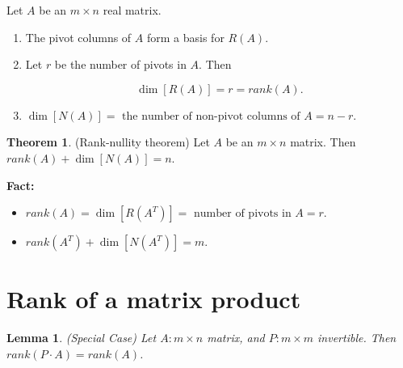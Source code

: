 \documentclass[12pt]{article}
\newtheorem*{lemma}{Lemma}
\theoremstyle{definition}
\newtheorem{theorem}{Theorem}[section]  %
\begin{document}
\noindent Let $A$ be an $m \times n$ real matrix.


\begin{enumerate}[label = (\arabic*)]
\item The pivot columns of $A$ form a basis for $R(A)$.
\item Let $r$ be the number of pivots in $A$. Then

\[\dim[R(A)] = r = rank(A). \]

\item $\dim[N(A)] = \text{ the number of non-pivot columns of } A = n - r$.
\end{enumerate}

\begin{theorem}
(Rank-nullity theorem) Let $A$ be an $m \times n$ matrix. Then $rank(A) + \dim[N(A)] = n$.
\end{theorem}


\noindent \textbf{Fact:}
\begin{itemize}
\item $rank(A) = \dim[R(A^T)] = \text{ number of pivots in } A = r$.
\item $rank(A^T) + \dim[N(A^T)] = m$.
\end{itemize}

\section{Rank of a matrix product}

\begin{lemma}
(Special Case) Let $A: m \times n$ matrix, and $P: m \times m$ invertible. Then $rank(P \cdot A) = rank(A)$.
\end{lemma}
\end{document}
